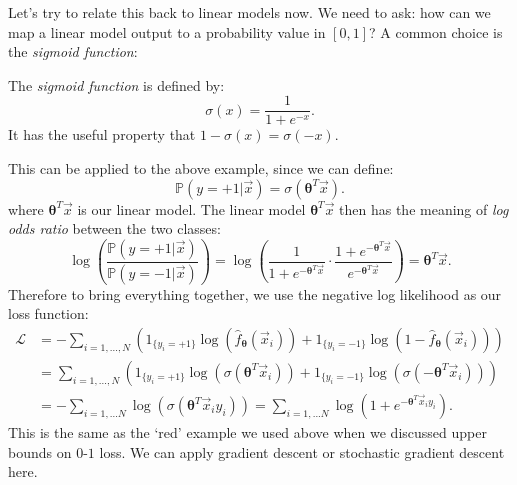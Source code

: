 Let's try to relate this back to linear models now. We need to ask: how can we map a linear model output to a probability value in $[0,1]$? A common choice is the \textit{sigmoid function}:
\begin{framedef}
The \textit{sigmoid function} is defined by:
\begin{equation*}
\sigma(x) = \frac{1}{1 + e^{-x}}.
\end{equation*}
It has the useful property that $1 - \sigma(x) = \sigma(-x)$. 
\end{framedef}
This can be applied to the above example, since we can define:
\begin{equation*}
\mathbb{P}(y=+1|\vec{x}) = \sigma(\pmb{\theta}^T \vec{x}). 
\end{equation*}
where $\pmb{\theta}^T \vec{x}$ is our linear model. The linear model $\pmb{\theta}^T \vec{x}$ then has the meaning of \textit{log odds ratio} between the two classes:
\begin{equation*}
\log\left( \frac{\mathbb{P}(y = +1 | \vec{x})}{\mathbb{P}(y = -1 | \vec{x})} \right) = \log\left( \frac{1}{1 + e^{-\pmb{\theta}^T \vec{x}}} \cdot \frac{1 + e^{-\pmb{\theta}^T \vec{x}}}{e^{-\pmb{\theta}^T \vec{x}}} \right) = \pmb{\theta}^T \vec{x}.
\end{equation*}
Therefore to bring everything together, we use the negative log likelihood as our loss function:
\begin{align*}
\mathcal{L} &= - \sum_{i=1,...,N} \left( 1_{\{y_i = +1\}} \log\left(\hat{f}_{\pmb{\theta}}(\vec{x}_i) \right) + 1_{\{y_i = -1\}} \log\left( 1 - \hat{f}_{\pmb{\theta}}(\vec{x}_i) \right) \right) \\[1.5ex]
&= \sum_{i=1,...,N} \left( 1_{\{y_i = +1\}} \log\left(\sigma(\pmb{\theta}^T \vec{x}_i)\right) + 1_{\{y_i = -1\}} \log\left(  \sigma(-\pmb{\theta}^T \vec{x}_i) \right) \right)\\[1.5ex]
&= - \sum_{i=1,...N} \log\left( \sigma(\pmb{\theta}^T \vec{x}_i y_i ) \right) = \sum_{i=1,...N} \log\left(1 + e^{-\pmb{\theta}^T \vec{x}_i y_i} \right).
\end{align*}
This is the same as the `red' example we used above when we discussed upper bounds on $0$-$1$ loss. We can apply gradient descent or stochastic gradient descent here.


